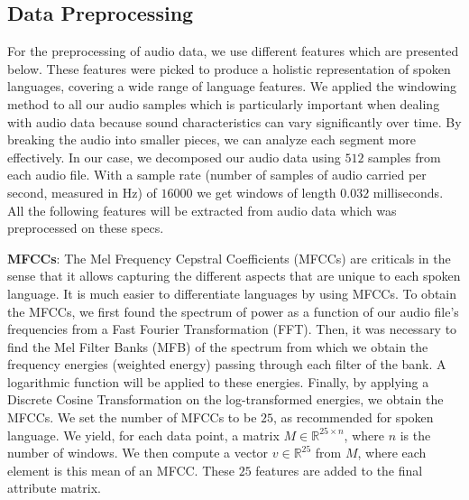 \documentclass[twocolumn]{article}
\newcommand{\R}{\mathbb{R}}
\begin{document}
\subsection{Data Preprocessing}
\label{3.4}
For the preprocessing of audio data, we use different features which are presented below. These features were picked to produce a holistic representation of spoken languages, covering a wide range of language features. We applied the windowing method to all our audio samples which is particularly important when dealing with audio data because sound characteristics can vary significantly over time. By breaking the audio into smaller pieces, we can analyze each segment more effectively. In our case, we decomposed our audio data using $512$ samples from each audio file. With a sample rate (number of samples of audio carried per second, measured in Hz) of $16000$ we get windows of length $0.032$ milliseconds. All the following features will be extracted from audio data which was preprocessed on these specs.

\textbf{MFCCs}:
The Mel Frequency Cepstral Coefficients (MFCCs) are criticals in the sense that it allows capturing the different aspects that are unique to each spoken language. It is much easier to differentiate languages by using MFCCs. To obtain the MFCCs, we first found the spectrum of power as a function of our audio file's frequencies from a Fast Fourier Transformation (FFT). Then, it was necessary to find the Mel Filter Banks (MFB) of the spectrum from which we obtain the frequency energies (weighted energy) passing through each filter of the bank. A logarithmic function will be applied to these energies. Finally, by applying a Discrete Cosine Transformation on the log-transformed energies, we obtain the MFCCs. We set the number of MFCCs to be $25$, as recommended for spoken language. We yield, for each data point, a matrix $M \in \R^{25 \times n}$, where $n$ is the number of windows. We then compute a vector $v \in \R^{25}$ from $M$, where each element is this mean of an MFCC. These $25$ features are added to the final attribute matrix. 
\end{document}
